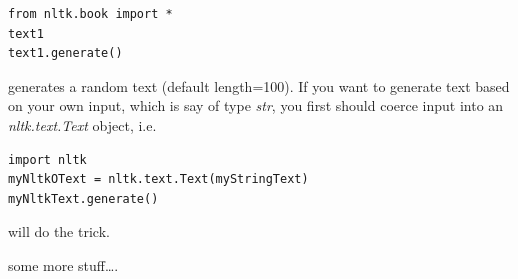 \begin{verbatim}
from nltk.book import *
text1
text1.generate()
\end{verbatim}

\noindent generates a random text (default length=100). If you want to generate text based on your own input, which is say of type \textit{str},
you first should coerce input into an \textit{nltk.text.Text} object, i.e. 


\begin{verbatim}
import nltk
myNltkOText = nltk.text.Text(myStringText)
myNltkText.generate()
\end{verbatim}

will do the trick. 



some more stuff\ldots.

 


































